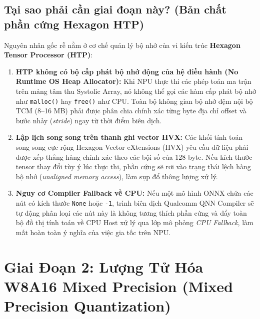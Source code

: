 \documentclass[11pt,a4paper,oneside,table]{report}
\begin{document}
\subsection{Tại sao phải cần giai đoạn này? (Bản chất phần cứng Hexagon HTP)}
Nguyên nhân gốc rễ nằm ở cơ chế quản lý bộ nhớ của vi kiến trúc \textbf{Hexagon Tensor Processor (HTP)}:
\begin{enumerate}
    \item \textbf{HTP không có bộ cấp phát bộ nhớ động của hệ điều hành (No Runtime OS Heap Allocator):} Khi NPU thực thi các phép toán ma trận trên mảng tâm thu Systolic Array, nó không thể gọi các hàm cấp phát bộ nhớ như \texttt{malloc()} hay \texttt{free()} như CPU. Toàn bộ không gian bộ nhớ đệm nội bộ TCM (8--16 MB) phải được phân chia chính xác từng byte địa chỉ offset và bước nhảy (\textit{stride}) ngay từ thời điểm biên dịch.
    \item \textbf{Lập lịch song song trên thanh ghi vector HVX:} Các khối tính toán song song cực rộng Hexagon Vector eXtensions (HVX) yêu cầu dữ liệu phải được xếp thẳng hàng chính xác theo các bội số của 128 byte. Nếu kích thước tensor thay đổi tùy ý lúc thực thi, phần cứng sẽ rơi vào trạng thái lệch hàng bộ nhớ (\textit{unaligned memory access}), làm sụp đổ thông lượng xử lý.
    \item \textbf{Nguy cơ Compiler Fallback về CPU:} Nếu một mô hình ONNX chứa các nút có kích thước \texttt{None} hoặc \texttt{-1}, trình biên dịch Qualcomm QNN Compiler sẽ tự động phân loại các nút này là không tương thích phần cứng và đẩy toàn bộ đồ thị tính toán về CPU Host xử lý qua lớp mô phỏng \textit{CPU Fallback}, làm mất hoàn toàn ý nghĩa của việc gia tốc trên NPU.
\end{enumerate}

\section{Giai Đoạn 2: Lượng Tử Hóa W8A16 Mixed Precision (Mixed Precision Quantization)}
\label{sec:stage2_quantization}
\end{document}

